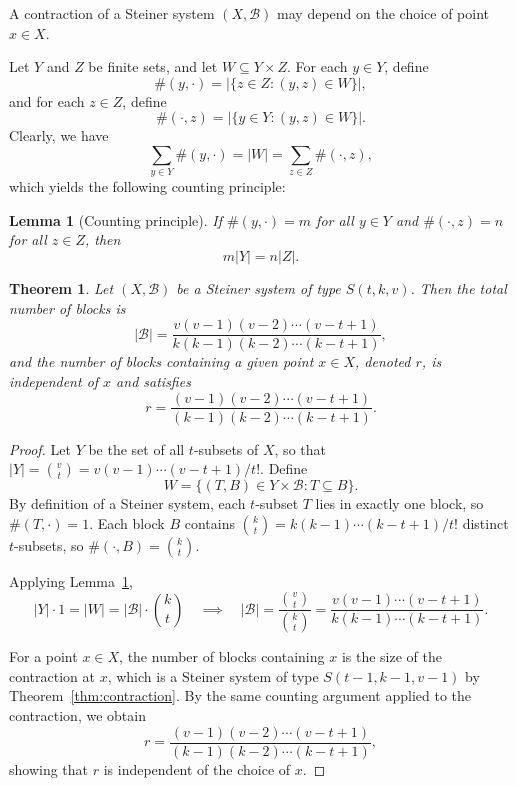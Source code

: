 \documentclass[12pt,a4paper,openany]{book}
\newtheorem{theorem}{Theorem}[section]
\newtheorem{lemma}{Lemma}[section]
\begin{document}
A contraction of a Steiner system $(X, \mathscr{B})$ may depend on the choice of point $x \in X$.

Let $Y$ and $Z$ be finite sets, and let $W \subseteq Y \times Z$. For each $y \in Y$, define
\[
\#(y, \cdot) = |\{ z \in Z : (y,z) \in W \}|,
\]
and for each $z \in Z$, define
\[
\#(\cdot, z) = |\{ y \in Y : (y,z) \in W \}|.
\]
Clearly, we have
\[
\sum_{y \in Y} \#(y, \cdot) = |W| = \sum_{z \in Z} \#(\cdot, z),
\]
which yields the following counting principle:

\begin{lemma}[Counting principle]\label{lem:counting}
If $\#(y, \cdot) = m$ for all $y \in Y$ and $\#(\cdot, z) = n$ for all $z \in Z$, then
\[
m |Y| = n |Z|.
\]
\end{lemma}

\begin{theorem}\label{thm:block-count}
Let $(X, \mathscr{B})$ be a Steiner system of type $S(t, k, v)$. Then the total number of blocks is
\[
|\mathscr{B}| = \frac{v(v-1)(v-2) \cdots (v-t+1)}{k(k-1)(k-2) \cdots (k-t+1)},
\]
and the number of blocks containing a given point $x \in X$, denoted $r$, is independent of $x$ and satisfies
\[
r = \frac{(v-1)(v-2) \cdots (v-t+1)}{(k-1)(k-2) \cdots (k-t+1)}.
\]
\end{theorem}

\begin{proof}
Let $Y$ be the set of all $t$-subsets of $X$, so that $|Y| = \binom{v}{t} = v(v-1)\cdots(v-t+1)/t!$.  
Define
\[
W = \{ (T, B) \in Y \times \mathscr{B} : T \subseteq B \}.
\]
By definition of a Steiner system, each $t$-subset $T$ lies in exactly one block, so $\#(T, \cdot) = 1$.  
Each block $B$ contains $\binom{k}{t} = k(k-1)\cdots(k-t+1)/t!$ distinct $t$-subsets, so $\#(\cdot, B) = \binom{k}{t}$.  

Applying Lemma~\ref{lem:counting},
\[
|Y| \cdot 1 = |W| = |\mathscr{B}| \cdot \binom{k}{t} \quad \implies \quad 
|\mathscr{B}| = \frac{\binom{v}{t}}{\binom{k}{t}} = \frac{v(v-1)\cdots(v-t+1)}{k(k-1)\cdots(k-t+1)}.
\]

For a point $x \in X$, the number of blocks containing $x$ is the size of the contraction at $x$, which is a Steiner system of type $S(t-1, k-1, v-1)$ by Theorem~\ref{thm:contraction}.  
By the same counting argument applied to the contraction, we obtain
\[
r = \frac{(v-1)(v-2)\cdots(v-t+1)}{(k-1)(k-2)\cdots(k-t+1)},
\]
showing that $r$ is independent of the choice of $x$.
\end{proof}
\end{document}

